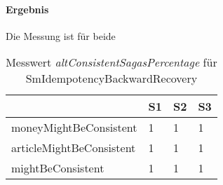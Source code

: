 \paragraph*{Ergebnis}
Die Messung ist für beide 

\begin{center}
	\fontsize{9}{12}\selectfont
	\begin{longtable}[h]{|p{4cm}|p{1cm}|p{1cm}|p{1cm}|}
		\hline
		 & S1 & S2 & S3 \\ \hline
		\endhead
		\caption{Messwert \textit{altConsistentSagasPercentage} für SmIdempotencyBackwardRecovery}
		\label{tab:smbasic_stateanalysisresult}
		\endfoot
		moneyMightBeConsistent & 1 & 1 & 1 \\ \hline	
		articleMightBeConsistent & 1 & 1 & 1 \\ \hline
		mightBeConsistent & 1 & 1 & 1 \\ \hline
	\end{longtable}
\end{center}
\FloatBarrier
